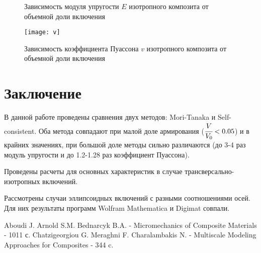 \documentclass[12pt, a4paper]{article}
\begin{document}
\begin{enumerate}
\begin{figure}[h!]
		\caption{Зависимость модуля упругости $E$ изотропного композита от объемной доли включения}
	\end{figure}
	
	\begin{figure}[h!]
		\centering
		\texttt{[image: v]}
		
		\caption{Зависимость коэффициента Пуассона $v$ изотропного композита от объемной доли включения}
	\end{figure}
\end{enumerate}

\newpage
\section{Заключение}
В данной работе проведены сравнения двух методов: Mori-Tanaka и Self-consistent. Оба метода совпадают при малой доле армирования ($\cfrac{V}{V_0}<0.05$) и в крайних значениях, при большой доле методы сильно различаются (до 3-4 раз модуль упругости и до 1.2-1.28 раз коэффициент Пуассона). 

Проведены расчеты для основных характеристик в случае трансверсально-изотропных включений.

Рассмотрены случаи эллипсоидных включений с разными соотношениями осей. Для них результаты программ Wolfram Mathematica и Digimat совпали.


\newpage

\begin{thebibliography}{4}
	 Aboudi J. Arnold S.M. Bednarcyk B.A. - Micromechanics of Composite Materials - 1011 с. 
	Chatzigeorgiou G. Meraghni F. Charalambakis N. - Multiscale Modeling Approaches for Composites - 344 c.
\end{thebibliography}
\end{document}
